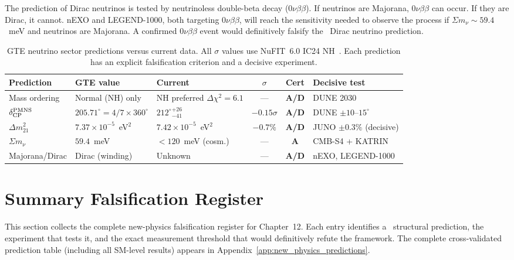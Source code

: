 \documentclass[11pt,openany]{book}
\theoremstyle{remark}
\newcommand{\GTE}{\text{GTE}}
\newcommand{\CatA}{\textbf{A}}
\newcommand{\CatAD}{\textbf{A/D}}
\begin{document}
The prediction of Dirac neutrinos is tested by neutrinoless double-beta decay
($0\nu\beta\beta$).  If neutrinos are Majorana, $0\nu\beta\beta$ can occur.  If they
are Dirac, it cannot.  nEXO and LEGEND-1000, both targeting $0\nu\beta\beta$, will
reach the sensitivity needed to observe the process if $\Sigma m_\nu \sim 59.4$~meV
and neutrinos are Majorana.  A confirmed $0\nu\beta\beta$ event would definitively
falsify the \GTE\ Dirac neutrino prediction.

\begin{table}[htbp]
\centering
\caption{GTE neutrino sector predictions versus current data.
  All $\sigma$ values use NuFIT~6.0 IC24 NH~\cite{NuFIT60}.
  Each prediction has an explicit falsification criterion and a decisive experiment.}
\label{tab:neutrino_predictions}
\small
\begin{tabularx}{\textwidth}{@{}>{\RaggedRight}p{2.4cm}>{\RaggedRight}p{2.6cm}>{\RaggedRight}p{2.4cm}cc>{\RaggedRight\arraybackslash}X@{}}
\toprule
\textbf{Prediction} & \textbf{GTE value} & \textbf{Current} &
  \textbf{$\sigma$} & \textbf{Cert} & \textbf{Decisive test} \\
\midrule
Mass ordering & Normal (NH) only & NH preferred $\Delta\chi^2=6.1$ & — & \CatAD &
  DUNE 2030 \\
$\delta_{\rm CP}^{\rm PMNS}$ & $205.71^\circ = 4/7\times360^\circ$ &
  $212^\circ{}^{+26}_{-41}$ & $-0.15\sigma$ & \CatAD & DUNE $\pm10$--$15^\circ$ \\
$\Delta m^2_{21}$ & $7.37\times10^{-5}$~eV$^2$ &
  $7.42\times10^{-5}$~eV$^2$ & $-0.7\%$ & \CatAD &
  JUNO $\pm 0.3\%$ (decisive) \\
$\Sigma m_\nu$ & $59.4$~meV & $< 120$~meV (cosm.) &
  — & \CatA & CMB-S4 + KATRIN \\
Majorana/Dirac & Dirac (winding) & Unknown &
  — & \CatAD & nEXO, LEGEND-1000 \\
\bottomrule
\end{tabularx}
\end{table}

\FloatBarrier

\section{Summary Falsification Register}
\label{sec:new_physics_summary}

This section collects the complete new-physics falsification register for Chapter~12.
Each entry identifies a \GTE\ structural prediction, the experiment that tests it, and
the exact measurement threshold that would definitively refute the framework.  The
complete cross-validated prediction table (including all SM-level results) appears in
Appendix~\ref{app:new_physics_predictions}.
\end{document}
